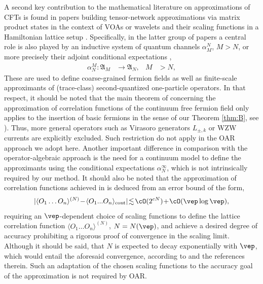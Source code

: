 \documentclass[a4paper, 11pt]{article}
\newcommand{\fA}{\mathfrak{A}}\newcommand{\cA}{\mathcal{A}}\newcommand{\dA}{\mathds{A}}\newcommand{\sA}{\mathscr{A}}
\DeclareMathOperator{\1}{\mathds{1}}
\begin{document}
A second key contribution to the mathematical literature on approximations of CFTs is found in papers building tensor-network approximations via matrix product states \cite{KoenigMatrixProductApproximations1, KoenigMatrixProductApproximations2} in the context of VOAs or wavelets and their scaling functions in a Hamiltonian lattice setup \cite{EvenblyEntanglementRenormalizationAnd, HaegemanRigorousFreeFermion, WitteveenQuantumCircuitApproximations}. Specifically, in the latter group of papers a central role is also played by an inductive system of quantum channels $\alpha^{N}_{M}$, $M>N$, or more precisely their adjoint conditional expectations \cite{EvansCompletelyPositiveQuasi},
\begin{align*}
\alpha^{M}_{N} : \fA_{M} & \longrightarrow \fA_{N}, & M & >N,
\end{align*}
These are used to define coarse-grained fermion fields as well as finite-scale approximants of (trace-class) second-quantized one-particle operators. In that respect, it should be noted that the main theorem of \cite{WitteveenQuantumCircuitApproximations} concerning the approximation of correlation functions of the continuum free fermion field only applies to the insertion of basic fermions in the sense of our Theorem \ref{thm:B}, see \cite[Theorem 4.4, p.~31]{WitteveenQuantumCircuitApproximations}). Thus, more general operators such as Virasoro generators $L_{\pm,k}$ or WZW currents are explicitly excluded. Such restriction do not apply in the OAR approach we adopt here. Another important difference in comparison with the operator-algebraic approach is the need for a continuum model to define the approximants using the conditional expectations $\alpha^{\infty}_{N}$, which is not intrinsically required by our method. It should also be noted that the approximation of correlation functions achieved in \cite{HaegemanRigorousFreeFermion, WitteveenQuantumCircuitApproximations} is deduced from an error bound of the form,
\begin{align*}
|\langle O_{1}\ldots O_{n}\rangle^{(N)}\!-\!\langle O_{1}...O_{n}\rangle_{\text{cont}}|\!\lesssim\!\cO(2^{c N})\!+\!\cO(\vep\log\vep),
\end{align*}
requiring an $\vep$-dependent choice of scaling functions to define the lattice correlation function $\langle O_{1}\dots O_{n}\rangle^{(N)}$, $N = N(\vep)$, and achieve a desired degree of accuracy prohibiting a rigorous proof of convergence in the scaling limit. Although it should be said, that $N$ is expected to decay exponentially with $\vep$, which would entail the aforesaid convergence, according to \cite{WitteveenQuantumCircuitApproximations} and the references therein. Such an adaptation of the chosen scaling functions to the accuracy goal of the approximation is not required by OAR.\\
\end{document}
